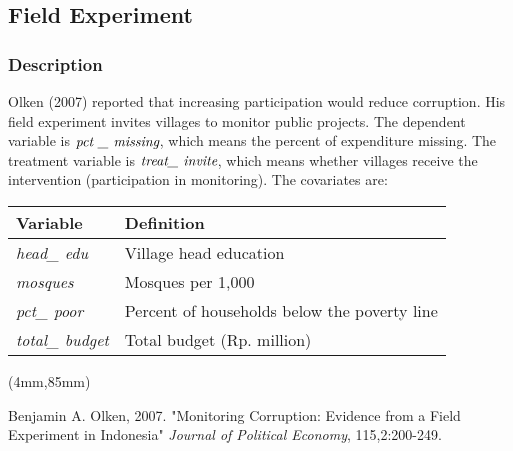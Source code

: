 \documentclass[xcolor=dvipsnames]{beamer}
\newenvironment{reference}[2]{%
  \begin{textblock*}{\textwidth}(#1,#2)
      \footnotesize\sf\bgroup\color{red!50!black}}{\egroup\end{textblock*}}
\begin{document}
\subsection{Field Experiment}
\begin{frame}\frametitle{Description}
Olken (2007) reported that increasing participation would reduce corruption. His field experiment invites villages to monitor public projects. The dependent variable is $\emph{pct \_ missing}$, which means the percent of expenditure missing. The treatment variable is $\emph{treat\_ invite}$, which means whether villages receive the intervention (participation in monitoring). The covariates are:
\begin{table}[ht]
\begin{center}
{\footnotesize
\begin{tabular}{ll}
\textbf{Variable} & \textbf{Definition}\\
\hline
\emph{head\_ edu} & Village head education  \\
\emph{mosques} & Mosques per 1,000 \\
\emph{pct\_ poor} & Percent of households below the poverty line\\
\emph{total\_ budget} & Total budget (Rp. million)\\
\hline
\end{tabular}
}
\end{center}
\end{table}
\begin{reference}{4mm}{85mm}

Benjamin A. Olken, 2007. "Monitoring Corruption: Evidence from a Field Experiment in Indonesia" \emph{Journal of Political Economy}, 115,2:200-249.
\end{reference}
\end{frame}
\end{document}
